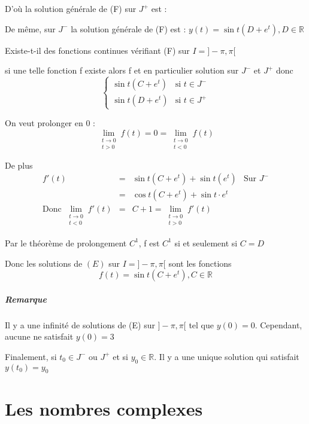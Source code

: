 D'où la solution générale de (F) sur $J^+$ est :

\begin{center}
\end{center}

De même, sur $J^-$ la solution générale de (F) est : $y(t) = \sin t(D+e^t), D\in \mathbb{R}$

Existe-t-il des fonctions continues vérifiant (F) sur $I = ]-\pi, \pi[$

si une telle fonction f existe alors f et en particulier solution sur $J^-$ et $J^+$ donc \[\left\{\begin{array}{rcl}
	\sin t(C + e^t) & \text{si } t \in J^- \\
	\sin t(D + e^t) & \text{si } t \in J^+\end{array}\right.\] 

			On veut prolonger en 0 :\[\lim_{\substack{t \to 0 \\ t > 0}} f(t) = 0 = \lim_{\substack{t \to 0 \\ t < 0}} f(t)\]

De plus
\[\begin{array}{rclr}
	f'(t)  &=& \sin t(C+e^t) + \sin t(e^t) & \text{Sur } J^-\\
		&=& \cos t(C +e^t) + \sin t \cdot e^t \\
\text{Donc } \lim_{\substack{t \to 0 \\ t < 0}} f'(t) &=& C+1 = \lim_{\substack{t \to 0 \\ t > 0}} f'(t) \end{array}\]

Par le théorème de prolongement $C^1$, f est $C^1$ si et seulement si $C=D$

Donc les solutions de $(E)$ sur $I = ]-\pi, \pi[$ sont les fonctions \[f(t) = \sin t(C+e^t), C\in \mathbb{R}\]

\paragraph{Remarque} Il y a une infinité de solutions de (E) sur $]-\pi, \pi[$ tel que $y(0)=0$. Cependant, aucune ne satisfait $y(0)=3$

Finalement, si $t_0 \in J^-$ ou $J^+$ et si $y_0 \in \mathbb{R}$. Il y a une unique solution qui satisfait $y(t_0)=y_0$

\chapter{Les nombres complexes}

